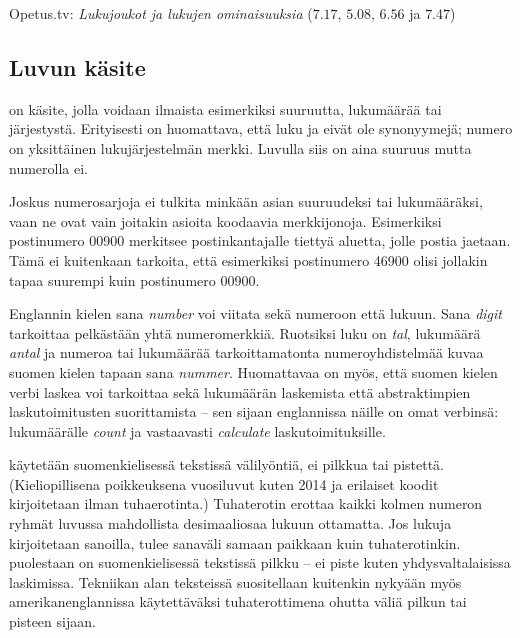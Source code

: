 {Opetus.tv: \emph{Lukujoukot ja lukujen ominaisuuksia} ($7.17$, $5.08$, $6.56$ ja $7.47$)}

\subsection{Luvun käsite}

 on käsite, jolla voidaan ilmaista esimerkiksi suuruutta, lukumäärää tai järjestystä. Erityisesti on huomattava, että luku ja  eivät ole synonyymejä; numero on yksittäinen lukujärjestelmän merkki. Luvulla siis on aina suuruus mutta numerolla ei.

\begin{esimerkki}
\end{esimerkki}

Joskus numerosarjoja ei tulkita minkään asian suuruudeksi tai lukumääräksi, vaan ne ovat vain joitakin asioita koodaavia merkkijonoja. Esimerkiksi postinumero 00900 merkitsee postinkantajalle tiettyä aluetta, jolle postia jaetaan. Tämä ei kuitenkaan tarkoita, että esimerkiksi postinumero 46900 olisi jollakin tapaa suurempi kuin postinumero 00900.


Englannin kielen sana \textit{number} voi viitata sekä numeroon että lukuun. Sana \textit{digit} tarkoittaa pelkästään yhtä numeromerkkiä. Ruotsiksi luku on \textit{tal}, lukumäärä \textit{antal} ja numeroa tai lukumäärää tarkoittamatonta numeroyhdistelmää kuvaa suomen kielen tapaan sana \textit{nummer}. Huomattavaa on myös, että suomen kielen verbi laskea voi tarkoittaa sekä lukumäärän laskemista että abstraktimpien laskutoimitusten suorittamista -- sen sijaan englannissa näille on omat verbinsä: lukumäärälle \textit{count} ja vastaavasti \textit{calculate} laskutoimituksille.

 käytetään suomenkielisessä tekstissä välilyöntiä, ei pilkkua tai pistettä. (Kieliopillisena poikkeuksena vuosiluvut kuten 2014 ja erilaiset koodit kirjoitetaan ilman tuhaerotinta.) Tuhaterotin erottaa kaikki kolmen numeron ryhmät luvussa mahdollista desimaaliosaa lukuun ottamatta. Jos lukuja kirjoitetaan sanoilla, tulee sanaväli samaan paikkaan kuin tuhaterotinkin.  puolestaan on suomenkielisessä tekstissä pilkku -- ei piste kuten yhdysvaltalaisissa laskimissa. Tekniikan alan teksteissä suositellaan kuitenkin nykyään myös amerikanenglannissa käytettäväksi tuhaterottimena ohutta väliä pilkun tai pisteen sijaan. %


